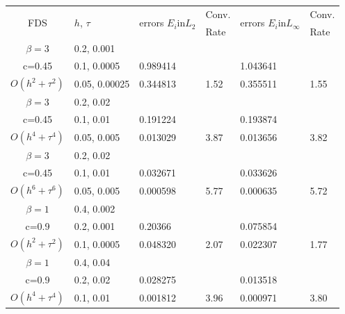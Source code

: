 \documentclass[%
 aip,
cp,  %
 amsmath,amssymb,%
 reprint,%
]{revtex4-2}
\begin{document}
\begin{table}[ht]
\centering
\small
		\begin{tabular}{||c|l|ll|ll||}
			\hline
			\hline
      \multirow{2  }{*}{FDS}        & \multirow{2  }{*}{$h$, $\tau$}  & \multirow{2  }{*}{errors $E_i$in$L_2$}  &Conv.& \multirow{2  }{*}{errors $E_i$in$L_\infty$}  &Conv.  \\
	         &                    &                               & Rate   &                                        & Rate \\
   			\hline 
					\hline 
  $\beta=3$                &0.2, 0.001          &              &              &                     &      \\
   c=0.45                     &0.1, 0.0005          &0.989414 &            &1.043641    &       \\
     $O(h^2 + \tau^ 2)$ &0.05, 0.00025   & 0.344813 & 1.52    &0.355511    &  1.55      \\
			\hline 
  $\beta=3$               &0.2, 0.02       &              &            &                     &      \\
   c=0.45                    &0.1, 0.01      &0.191224 &            &0.193874    &       \\
     $O(h^4+ \tau^4)$ &0.05, 0.005&0.013029 & 3.87   &0.013656     &3.82       \\
			\hline 
  $\beta=3$               &0.2, 0.02       &                &            &                     &      \\
     c=0.45                 &0.1, 0.01        &0.032671 &            &  0.033626    &       \\
     $O(h^6+ \tau^6)$ &0.05, 0.005 &0.000598 &5.77     & 0.000635    & 5.72       \\
	   \hline
			\hline 
       $\beta=1$       &0.4, 0.002        &             &            &           &   \\
                  c=0.9    &0.2, 0.001       &  0.20366   &            &0.075854 &   \\
  $O(h^2+ \tau^2)$ &0.1, 0.0005   &0.048320   &2.07  &0.022307  & 1.77 \\
			\hline
      $\beta=1$               &0.4, 0.04    &            &               &             &    \\
       c=0.9                     &0.2, 0.02     & 0.028275   &        &  0.013518   &   \\
       $O(h^4+ \tau^4)$ &0.1, 0.01   &0.001812 & 3.96  & 0.000971  & 3.80  \\

\end{tabular}
\end{table}
\end{document}
